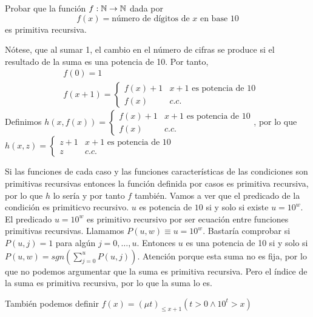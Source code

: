 \documentclass[twoside]{article}
\begin{document}
\begin{ejercicio}{6}
Probar que la función $f:\mathbb{N}\to\mathbb{N}$ dada por $$f(x)=\text{número de dígitos de }x\text{ en base }10$$ es primitiva recursiva.
\end{ejercicio}
\begin{solucion}
Nótese, que al sumar 1, el cambio en el número de cifras se produce si el resultado de la suma es una potencia de 10. Por tanto, 
\begin{align*}
&f(0)=1\\
&f(x+1)=\begin{cases}
f(x)+1 & x+1\text{ es potencia de } 10\\
f(x) & c.c.
\end{cases}
\end{align*}
Definimos $h(x,f(x))=\begin{cases}
f(x)+1 & x+1\text{ es potencia de } 10\\
f(x) & c.c.
\end{cases}$, por lo que $h(x,z)=\begin{cases}
z+1 & x+1\text{ es potencia de } 10\\
z & c.c.
\end{cases}$

Si las funciones de cada caso y las funciones características de las condiciones son primitivas recursivas entonces la función definida por casos es primitiva recursiva, por lo que $h$ lo sería y por tanto $f$ también. Vamos a ver que el predicado de la condición es primiticvo recursivo. $u$ es potencia de $10$ si y solo si existe $u=10^w$. El predicado $u=10^w$ es primitivo recursivo por ser ecuación entre funciones primitivas recursivas. Llamamos $P(u,w)\equiv u=10^w$. Bastaría comprobar si $P(u,j)=1$ para algún $j=0,\dots, u$. Entonces $u$ es una potencia de 10 si y solo si $P(u,w)=sgn(\sum_{j=0}^u P(u,j))$. Atención porque esta suma no es fija, por lo que no podemos argumentar que la suma es primitiva recursiva. Pero el índice de la suma es primitiva recursiva, por lo que la suma lo es.


También podemos definir $f(x)=(\mu t)_{\leq x+1}(t>0\land 10^t> x)$ 
\end{solucion}

\newpage
\end{document}
